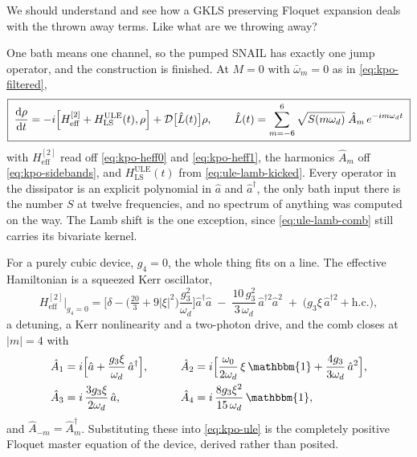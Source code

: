 \documentclass[a4paper,11pt]{article}
\newcommand{\id}{\mathbbm{1}}
\newcommand{\Dcal}{\mathcal{D}}
\newcommand{\eff}{\mathrm{eff}}
\begin{document}
\begin{todo}
We should understand and see how a GKLS preserving Floquet expansion deals with the thrown away terms. Like what are we throwing away?
\end{todo}

\begin{example}
One bath means one channel, so the pumped SNAIL has exactly one jump operator, and the construction is finished. At $M=0$ with $\bar\omega_m=0$ as in \eqref{eq:kpo-filtered},
\begin{equation}\label{eq:kpo-ule}
  \boxed{\;
  \dv{\rho}{t} = -i\comm{H_\eff^{[2]} + H^{\mathrm{ULE}}_{\mathrm{LS}}(t)}{\rho} + \Dcal\big[\hat L(t)\big]\rho ,
  \qquad
  \hat L(t) = \sum_{m=-6}^{6}\sqrt{S(m\omega_d)}\;\hat A_m\,e^{-im\omega_d t} \; }
\end{equation}
with $H_\eff^{[2]}$ read off \eqref{eq:kpo-heff0} and \eqref{eq:kpo-heff1}, the harmonics $\hat A_m$ off \eqref{eq:kpo-sidebands}, and $H^{\mathrm{ULE}}_{\mathrm{LS}}(t)$ from \eqref{eq:ule-lamb-kicked}. Every operator in the dissipator is an explicit polynomial in $\hat a$ and $\hat a^\dagger$, the only bath input there is the number $S$ at twelve frequencies, and no spectrum of anything was computed on the way. The Lamb shift is the one exception, since \eqref{eq:ule-lamb-comb} still carries its bivariate kernel.

For a purely cubic device, $g_4 = 0$, the whole thing fits on a line. The effective Hamiltonian is a squeezed Kerr oscillator,
\begin{equation}\label{eq:kpo-heff-cubic}
  H_\eff^{[2]}\Big|_{g_4=0}
  = \Big[\delta - \big(\tfrac{20}{3} + 9\lvert\xi\rvert^2\big)\frac{g_3^2}{\omega_d}\Big]\hat a^\dagger\hat a
  \;-\; \frac{10\,g_3^2}{3\,\omega_d}\,\hat a^{\dagger2}\hat a^2
  \;+\; \big(g_3\xi\,\hat a^{\dagger2} + \mathrm{h.c.}\big),
\end{equation}
a detuning, a Kerr nonlinearity and a two-photon drive, and the comb closes at $\lvert m\rvert = 4$ with
\begin{equation}\label{eq:kpo-jumps-cubic}
  \begin{aligned}
    \hat A_1 &= i\Big[\hat a + \frac{g_3\xi}{\omega_d}\,\hat a^\dagger\Big],
    &\qquad
    \hat A_2 &= i\Big[\frac{\omega_0}{2\omega_d}\,\xi\,\id + \frac{4g_3}{3\omega_d}\,\hat a^2\Big],\\
    \hat A_3 &= i\,\frac{3g_3\xi}{2\omega_d}\,\hat a,
    &\qquad
    \hat A_4 &= i\,\frac{8g_3\xi^2}{15\,\omega_d}\,\id,
  \end{aligned}
\end{equation}
and $\hat A_{-m} = \hat A_m^\dagger$. Substituting these into \eqref{eq:kpo-ule} is the completely positive Floquet master equation of the device, derived rather than posited.


\end{example}
\end{document}
